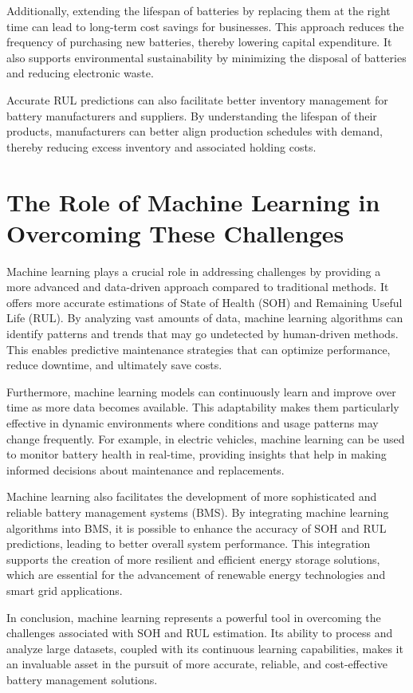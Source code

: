 Additionally, extending the lifespan of batteries by replacing them at the right time can lead to long-term cost savings for businesses. This approach reduces the frequency of purchasing new batteries, thereby lowering capital expenditure. It also supports environmental sustainability by minimizing the disposal of batteries and reducing electronic waste.

Accurate RUL predictions can also facilitate better inventory management for battery manufacturers and suppliers. By understanding the lifespan of their products, manufacturers can better align production schedules with demand, thereby reducing excess inventory and associated holding costs.

\section{The Role of Machine Learning in Overcoming These Challenges}
Machine learning plays a crucial role in addressing challenges by providing a more advanced and data-driven approach compared to traditional methods. It offers more accurate estimations of State of Health (SOH) and Remaining Useful Life (RUL). By analyzing vast amounts of data, machine learning algorithms can identify patterns and trends that may go undetected by human-driven methods. This enables predictive maintenance strategies that can optimize performance, reduce downtime, and ultimately save costs.

Furthermore, machine learning models can continuously learn and improve over time as more data becomes available. This adaptability makes them particularly effective in dynamic environments where conditions and usage patterns may change frequently. For example, in electric vehicles, machine learning can be used to monitor battery health in real-time, providing insights that help in making informed decisions about maintenance and replacements.

Machine learning also facilitates the development of more sophisticated and reliable battery management systems (BMS). By integrating machine learning algorithms into BMS, it is possible to enhance the accuracy of SOH and RUL predictions, leading to better overall system performance. This integration supports the creation of more resilient and efficient energy storage solutions, which are essential for the advancement of renewable energy technologies and smart grid applications.

In conclusion, machine learning represents a powerful tool in overcoming the challenges associated with SOH and RUL estimation. Its ability to process and analyze large datasets, coupled with its continuous learning capabilities, makes it an invaluable asset in the pursuit of more accurate, reliable, and cost-effective battery management solutions.

